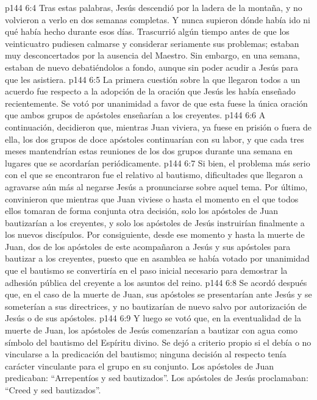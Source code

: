 \vs p144 6:4 Tras estas palabras, Jesús descendió por la ladera de la montaña, y no volvieron a verlo en dos semanas completas. Y nunca supieron dónde había ido ni qué había hecho durante esos días. Trascurrió algún tiempo antes de que los veinticuatro pudiesen calmarse y considerar seriamente sus problemas; estaban muy desconcertados por la ausencia del Maestro. Sin embargo, en una semana, estaban de nuevo debatiéndolos a fondo, aunque sin poder acudir a Jesús para que les asistiera.
\vs p144 6:5 La primera cuestión sobre la que llegaron todos a un acuerdo fue respecto a la adopción de la oración que Jesús les había enseñado recientemente. Se votó por unanimidad a favor de que esta fuese la única oración que ambos grupos de apóstoles enseñarían a los creyentes.
\vs p144 6:6 A continuación, decidieron que, mientras Juan viviera, ya fuese en prisión o fuera de ella, los dos grupos de doce apóstoles continuarían con su labor, y que cada tres meses mantendrían estas reuniones de los dos grupos durante una semana en lugares que se acordarían periódicamente.
\vs p144 6:7 Si bien, el problema más serio con el que se encontraron fue el relativo al bautismo, dificultades que llegaron a agravarse aún más al negarse Jesús a pronunciarse sobre aquel tema. Por último, convinieron que mientras que Juan viviese o hasta el momento en el que todos ellos tomaran de forma conjunta otra decisión, solo los apóstoles de Juan bautizarían a los creyentes, y solo los apóstoles de Jesús instruirían finalmente a los nuevos discípulos. Por consiguiente, desde ese momento y hasta la muerte de Juan, dos de los apóstoles de este acompañaron a Jesús y sus apóstoles para bautizar a los creyentes, puesto que en asamblea se había votado por unanimidad que el bautismo se convertiría en el paso inicial necesario para demostrar la adhesión pública del creyente a los asuntos del reino.
\vs p144 6:8 Se acordó después que, en el caso de la muerte de Juan, sus apóstoles se presentarían ante Jesús y se someterían a sus directrices, y no bautizarían de nuevo salvo por autorización de Jesús o de sus apóstoles.
\vs p144 6:9 Y luego se votó que, en la eventualidad de la muerte de Juan, los apóstoles de Jesús comenzarían a bautizar con agua como símbolo del bautismo del Espíritu divino. Se dejó a criterio propio si el  debía o no vincularse a la predicación del bautismo; ninguna decisión al respecto tenía carácter vinculante para el grupo en su conjunto. Los apóstoles de Juan predicaban: “Arrepentíos y sed bautizados”. Los apóstoles de Jesús proclamaban: “Creed y sed bautizados”.
